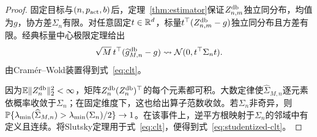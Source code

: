 \begin{proof}
固定目标与$(n,p_{\rm act},b)$后，定理~\ref{thm:estimator}保证$Z_{n,m}^{\mathrm{db}}$独立同分布，均值为$g$，协方差$\Sigma_n$有限。对任意固定$t\in\mathbb R^d$，标量$t^\top(Z_{n,m}^{\mathrm{db}}-g)$独立同分布且方差有限。经典标量中心极限定理给出
\[
 \sqrt M\,t^\top(\widehat g_{M,n}^{\mathrm{db}}-g)
 \rightsquigarrow \mathcal N(0,t^\top\Sigma_nt).
\]
由Cram\'er--Wold装置得到式~\eqref{eq:clt}。

因为$\mathbb E\lVert Z_n^{\mathrm{db}}\rVert_2^2<\infty$，矩阵$Z_n^{\mathrm{db}}(Z_n^{\mathrm{db}})^\top$的每个元素都可积。大数定律使$\widehat\Sigma_{M,n}$逐元素依概率收敛于$\Sigma_n$；在固定维度下，这也给出算子范数收敛。若$\Sigma_n$非奇异，则
$\mathbb P\{\lambda_{\min}(\widehat\Sigma_{M,n})>\lambda_{\min}(\Sigma_n)/2\}\to1$。在该事件上，逆平方根映射于$\Sigma_n$的邻域中有定义且连续。将Slutsky定理用于式~\eqref{eq:clt}，便得到式~\eqref{eq:studentized-clt}。
\end{proof}
